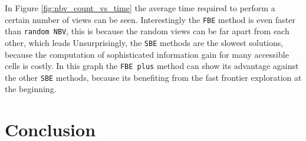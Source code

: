 \documentclass[a4paper,11pt,english]{article}
\begin{document}
In Figure \ref{fig:nbv_count_vs_time} the average time required to perform a certain number of views can be seen. 
Interestingly the \texttt{FBE} method is even faster than \texttt{random NBV}, this is because the random views can be far apart from each other, which leads Unsurprisingly, the \texttt{SBE} methods are the slowest solutions, because the computation of sophisticated information gain for many accessible cells is costly. In this graph the \texttt{FBE plus} method can show its advantage against the other \texttt{SBE} methods, because its  benefiting from the fast frontier exploration at the beginning.

\section{Conclusion}
\label{Conclusion}



\newpage


\end{document}
